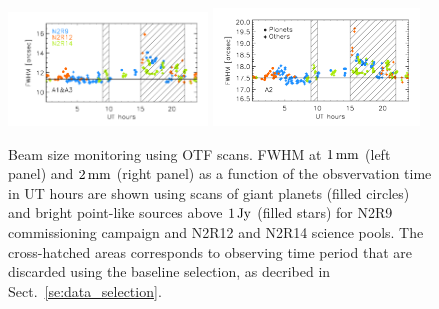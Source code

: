 \begin{figure}[ht!]
  \begin{center}
    \includegraphics[clip=true, trim={0.9cm, 0.5cm, 0.5cm, 0.5cm}, width=0.4725\textwidth]{Figures/Beams/Beam_monitoring_with_otfs_vs_ut_1mm.pdf}
    \includegraphics[clip=true, trim={0.5cm, 0.5cm, 0.5cm, 0.5cm}, width=0.4875\textwidth]{Figures/Beams/Beam_monitoring_with_otfs_vs_ut_a2.pdf}
    \caption[Beam size monitoring using OTF scans]{Beam size
      monitoring using OTF scans. FWHM at $1\,\rm{mm}$ (left panel)
      and $2\,\rm{mm}$ (right panel) as a function of the
      obsvervation time in UT hours are shown using scans of giant
      planets (filled circles) and bright point-like sources above
      $1\,\rm{Jy}$ (filled stars) for N2R9 commissioning campaign and
      N2R12 and N2R14 science pools. The cross-hatched areas
      corresponds to observing time period that are discarded using
      the baseline selection, as decribed in Sect.~\ref{se:data_selection}.} 
\label{fig:beam_monitoring_otf}
  \end{center}
\end{figure}

